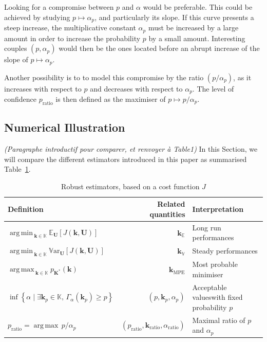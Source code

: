 \documentclass[preprint, 1p]{elsarticle}
\DeclareMathOperator*{\argmin}{arg\,min \,}
\DeclareMathOperator*{\argmax}{arg\,max \,}
\newcommand{\Var}{\mathbb{V}\textrm{ar}}
\newcommand{\Ex}{\mathbb{E}}
\newcommand{\kmean}{{\mathbf{k}}_{\Ex}}
\newcommand{\kvar}{{\mathbf{k}}_{\mathbb{V}}}
\newcommand{\kmpe}{{\mathbf{k}}_{\mathrm{MPE}}}
\newcommand{\checkap}{{\alpha}_p}
\newcommand{\checka}{{\alpha}}
\newcommand{\checkk}{\mathbf{k}}
\newcommand{\checkkp}{{\mathbf{k}}_p}
\newcommand{\Kspace}{\mathbb{K}}
\newcommand{\victor}[1]{{\itshape\color{green} ({#1})}}
\begin{document}
Looking for a compromise between $p$ and $\alpha$ would be preferable. This could be achieved by studying $p \mapsto \checkap$, and particularly its slope.
If this curve presents a steep increase, the multiplicative constant $\checkap$ must be increased by a large amount in order to increase the probability $p$ by a small amount. Interesting couples $(p,\checkap)$ would then be the ones located before an abrupt increase of the slope of $p \mapsto \checkap$.

Another possibility is to to model this compromise by the ratio $(p/\checkap)$, as it increases with respect to $p$ and decreases with respect to $\checka_p$. The level of confidence $p_{\mathrm{ratio}}$ is then defined as the maximiser of $p\mapsto p / \checka_p$.







\subsection{Numerical Illustration}
\victor{Paragraphe introductif pour comparer, et renvoyer à Table1}
In this Section, we will compare the different estimators introduced in this paper as summarised Table~\ref{tab:RO_recap}.

\begin{table}[t]
  \centering
\begin{tabular}{lrp{5cm}}
  \toprule
  Definition & Related quantities & Interpretation \\ \midrule
   $\argmin_{\mathbf{k}\in\Kspace} \Ex_{\mathbf{U}}\left[J(\mathbf{k},\mathbf{U})\right]$& $\kmean$ & Long run performances\\
   $\argmin_{\mathbf{k}\in\Kspace} \Var_{\mathbf{U}}\left[J(\mathbf{k},\mathbf{U})\right]$& $\kvar$  & Steady performances\\
   $\argmax_{\mathbf{k}\in\Kspace} p_{\mathbf{K}^*}(\mathbf{k})$ & $\kmpe$ & Most probable minimiser\\
    $\inf\left\{ \alpha \mid \exists \checkkp \in \Kspace,\, \Gamma_{\alpha}(\checkkp) \geq p \right\}$ & $(p, \checkkp,\checkap)$ & Acceptable values\newline with fixed probability $p$ \\
    $p_{\mathrm{ratio}} = \argmax p/\checkap$ & $(p_{\mathrm{ratio}}, \checkk_{\mathrm{ratio}}, \checka_{\mathrm{ratio}})$ & Maximal ratio of $p$ and $\checkap$ \\
  \bottomrule
\end{tabular}
\caption{Robust estimators, based on a cost function $J$}
\label{tab:RO_recap}
\end{table}
\end{document}
